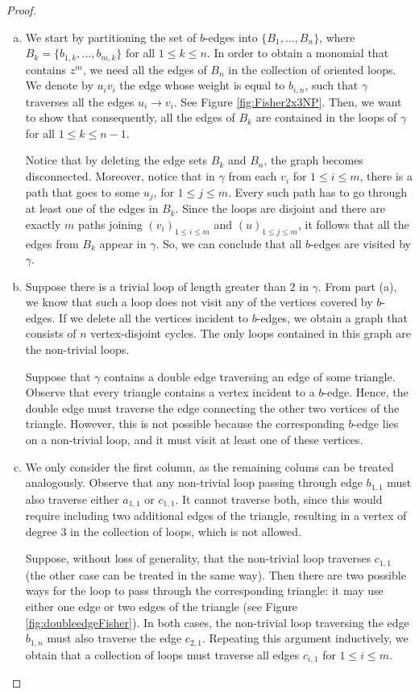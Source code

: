 \documentclass[12pt,a4paper]{article}
\theoremstyle{definition}
\begin{document}
\begin{proof}
    \begin{enumerate}[(a)]
        \item We start by partitioning the set of $b$-edges into $\{B_1, \dots, B_n\}$, where $B_k = \{b_{1,k}, \dots, b_{m,k}\}$ for all $1 \leq k \leq n$.  In order to obtain a monomial that contains $z^m$, we need all the edges of $B_n$ in the collection of oriented loops. We denote by $u_iv_i$ the edge whose weight is equal to $b_{i,n}$, such that $\gamma$ traverses all the edges $u_i \to v_i$. See Figure \ref{fig:Fisher2x3NP}. Then, we want to show that consequently, all the edges of $B_k$ are contained in the loops of $\gamma$ for all $1 \leq k \leq n-1$.

        Notice that by deleting the edge sets $B_k$ and $B_n$, the graph becomes disconnected. Moreover, notice that in $\gamma$ from each $v_i$ for $1 \leq i \leq m$, there is a path that goes to some $u_j$, for $1 \leq j \leq m$. Every such path has to go through at least one of the edges in $B_k$. Since the loops are disjoint and there are exactly $m$ paths joining $(v_i)_{1 \leq i \leq m}$ and $(u)_{1 \leq j \leq m}$, it follows that all the edges from $B_k$ appear in $\gamma$. So, we can conclude that all $b$-edges are visited by $\gamma$. 
        \item Suppose there is a trivial loop of length greater than $2$ in $\gamma$. From part (a), we know that such a loop does not visit any of the vertices covered by $b$-edges. If we delete all the vertices incident to $b$-edges, we obtain a graph that consists of $n$ vertex-disjoint cycles. The only loops contained in this graph are the non-trivial loops.
        
        Suppose that $\gamma$ contains a double edge traversing an edge of some triangle. Observe that every triangle contains a vertex incident to a $b$-edge. Hence, the double edge must traverse the edge connecting the other two vertices of the triangle. However, this is not possible because the corresponding $b$-edge lies on a non-trivial loop, and it must visit at least one of these vertices.
        \item We only consider the first column, as the remaining colums can be treated analogously. Observe that any non-trivial loop passing through edge $b_{1,1}$ must also traverse either $a_{1,1}$ or $c_{1,1}$. It cannot traverse both, since this would require including two additional edges of the triangle, resulting in a vertex of degree $3$ in the collection of loops, which is not allowed.
        
        Suppose, without loss of generality, that the non-trivial loop traverses $c_{1,1}$ (the other case can be treated in the same way). Then there are two possible ways for the loop to pass through the corresponding triangle: it may use either one edge or two edges of the triangle (see Figure \ref{fig:doubleedgeFisher}). In both cases, the non-trivial loop traversing the edge $b_{1,n}$ must also traverse the edge $c_{2,1}$. Repeating this argument inductively, we obtain that a collection of loops must traverse all edges $c_{i,1}$ for $1 \leq i \leq m$.
    \end{enumerate}
\end{proof}
\end{document}
